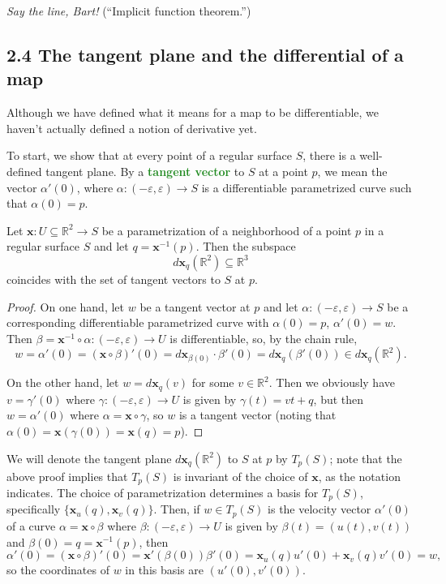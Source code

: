 \documentclass[10pt]{scrartcl}
\providecommand{\eps}{\varepsilon}
\providecommand{\RR}{\mathbb R}
\providecommand{\inv}{^{-1}}
\providecommand{\mb}[1]{\mathbf{#1}}
\providecommand{\vocab}[1]{{\textbf{\textcolor{ForestGreen}{#1}}}}
\begin{document}
\begin{exercise}
	\emph{Say the line, Bart!} (``Implicit function theorem.'')
\end{exercise}

\subsection{2.4 The tangent plane and the differential of a map}
Although we have defined what it means for a map to be differentiable,
we haven't actually defined a notion of derivative yet.

To start, we show that at every point of a regular surface $S$,
there is a well-defined tangent plane.
By a \vocab{tangent vector} to $S$ at a point $p$,
we mean the vector $\alpha'(0)$, where $\alpha\colon(-\eps,\eps)\to S$
is a differentiable parametrized curve such that $\alpha(0) = p$.

\begin{prop}
	Let $\mb x\colon U\subseteq\RR^2\to S$ be a parametrization
	of a neighborhood of a point $p$ in a regular surface $S$
	and let $q = \mb x\inv(p)$. Then the subspace
	\[d\mb x_q(\RR^2)\subseteq\RR^3\]
	coincides with the set of tangent vectors to $S$ at $p$.
\end{prop}

\begin{proof}
	On one hand, let $w$ be a tangent vector at $p$
	and let $\alpha\colon(-\eps,\eps)\to S$ be a corresponding
	differentiable parametrized curve with $\alpha(0)=p$, $\alpha'(0)=w$.
	Then $\beta = \mb x\inv\circ\alpha\colon(-\eps,\eps)\to U$
	is differentiable, so, by the chain rule,
	\[w = \alpha'(0) = (\mb x\circ \beta)'(0)
	= d\mb x_{\beta(0)}\cdot \beta'(0) = d\mb x_q(\beta'(0))
	\in d\mb x_q(\RR^2).\]
	
	On the other hand, let $w = d\mb x_q(v)$ for some $v\in\RR^2$.
	Then we obviously have $v = \gamma'(0)$ where
	$\gamma\colon (-\eps,\eps)\to U$ is given by $\gamma(t) = vt+q$,
	but then $w = \alpha'(0)$ where $\alpha = \mb x\circ\gamma$,
	so $w$ is a tangent vector (noting that $\alpha(0) = \mb x(\gamma(0))
	= \mb x(q) = p$).
\end{proof}

We will denote the tangent plane $d\mb x_q(\RR^2)$
to $S$ at $p$ by $T_p(S)$; note that the above proof implies that
$T_p(S)$ is invariant of the choice of $\mb x$, as the notation indicates.
The choice of parametrization determines a basis for $T_p(S)$,
specifically $\{\mb x_u(q), \mb x_v(q)\}$.
Then, if $w\in T_p(S)$ is the velocity vector $\alpha'(0)$
of a curve $\alpha = \mb x\circ\beta$ where $\beta\colon(-\eps,\eps)\to U$
is given by $\beta(t) = (u(t), v(t))$ and $\beta(0) = q = \mb x\inv(p)$, then
\[\alpha'(0) = (\mb x\circ \beta)'(0) = \mb x'(\beta(0))\beta'(0)
= \mb x_u(q)u'(0) + \mb x_v(q)v'(0) = w,\]
so the coordinates of $w$ in this basis are $(u'(0), v'(0))$.
\end{document}
